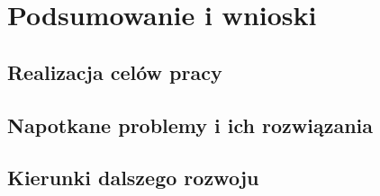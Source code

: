 \chapter{Podsumowanie i wnioski}
\label{chap:podsumowanie}

\section{Realizacja celów pracy}
\label{sec:realizacja}

\section{Napotkane problemy i ich rozwiązania}
\label{sec:problemy}

\section{Kierunki dalszego rozwoju}
\label{sec:rozwoj}
